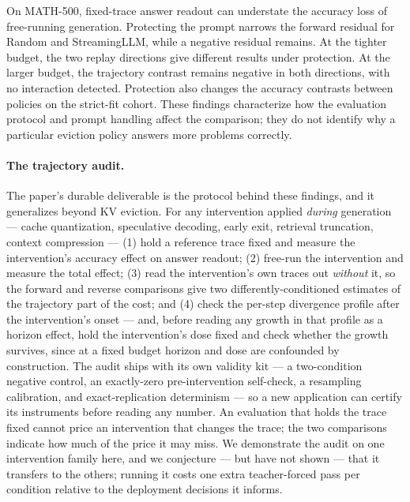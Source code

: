\documentclass{article}
\begin{document}
On MATH-500, fixed-trace answer readout can understate the accuracy loss of free-running generation. Protecting the prompt narrows the forward residual for Random and StreamingLLM, while a negative residual remains. At the tighter budget, the two replay directions give different results under protection. At the larger budget, the trajectory contrast remains negative in both directions, with no interaction detected. Protection also changes the accuracy contrasts between policies on the strict-fit cohort. These findings characterize how the evaluation protocol and prompt handling affect the comparison; they do not identify why a particular eviction policy answers more problems correctly.

\paragraph{The trajectory audit.} The paper's durable deliverable is the protocol behind these findings, and it generalizes beyond KV eviction. For any intervention applied \emph{during} generation --- cache quantization, speculative decoding, early exit, retrieval truncation, context compression --- (1) hold a reference trace fixed and measure the intervention's accuracy effect on answer readout; (2) free-run the intervention and measure the total effect; (3) read the intervention's own traces out \emph{without} it, so the forward and reverse comparisons give two differently-conditioned estimates of the trajectory part of the cost; and (4) check the per-step divergence profile after the intervention's onset --- and, before reading any growth in that profile as a horizon effect, hold the intervention's dose fixed and check whether the growth survives, since at a fixed budget horizon and dose are confounded by construction. The audit ships with its own validity kit --- a two-condition negative control, an exactly-zero pre-intervention self-check, a resampling calibration, and exact-replication determinism --- so a new application can certify its instruments before reading any number. An evaluation that holds the trace fixed cannot price an intervention that changes the trace; the two comparisons indicate how much of the price it may miss. We demonstrate the audit on one intervention family here, and we conjecture --- but have not shown --- that it transfers to the others; running it costs one extra teacher-forced pass per condition relative to the deployment decisions it informs.
\end{document}
